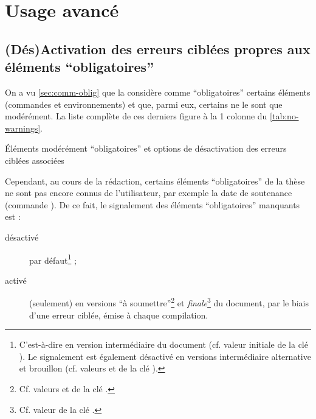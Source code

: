 \chapter{Usage avancé}\label{cha:usage-avance}

\section{(Dés)Activation des erreurs ciblées propres aux éléments
  \enquote{obligatoires}}\label{sec:desact-des-erre}

On a vu \vref{sec:comm-oblig} que la \yatcl{} considère comme
\enquote{obligatoires} certains éléments (commandes et environnements) et que,
parmi eux, certains ne le sont que modérément. La liste complète de ces
derniers figure à la 1\iere{} colonne du \vref{tab:no-warnings}.
\begin{table}[ht]
  \centering
  
  \caption{Éléments modérément \enquote{obligatoires} et options de désactivation des erreurs
    ciblées associées}
  \label{tab:no-warnings}
\end{table}

Cependant, au cours de la rédaction, certains éléments \enquote{obligatoires}
de la thèse ne sont pas encore connus de l'utilisateur, par exemple la date de
soutenance (commande ).
De ce fait, le signalement des éléments \enquote{obligatoires} manquants est :
\begin{description}
\item[désactivé] par défaut\footnote{C'est-à-dire en version intermédiaire du
    document (cf. valeur initiale  de la clé
    ). Le signalement est également désactivé en versions
    intermédiaire alternative et brouillon (cf. valeurs 
    et  de la clé ).} ;
\item[activé] (seulement) en versions \enquote{à
    soumettre}\footnote{Cf. valeurs  et
     de la clé .} et
  \emph{finale}\footnote{Cf. valeur  de la clé
    .} du document, par le biais d'une erreur ciblée, émise
  à chaque compilation.
\end{description}

